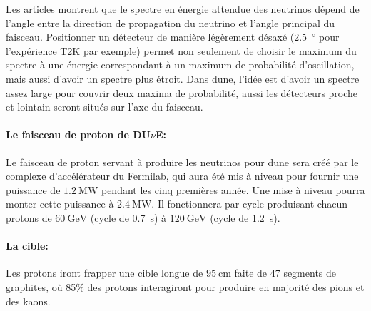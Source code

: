             Les articles \cite{Levy2010,McDonald2001,Itow2001} montrent que le spectre en énergie attendue des neutrinos dépend de l'angle entre la direction de propagation du neutrino et l'angle principal du faisceau. Positionner un détecteur de manière légèrement désaxé (\SI{2.5}{\degree} pour l'expérience T2K par exemple) permet non seulement de choisir le maximum du spectre à une énergie correspondant à un maximum de probabilité d'oscillation, mais aussi d'avoir un spectre plus étroit. Dans \gls{dune}, l'idée est d'avoir un spectre assez large pour couvrir deux maxima de probabilité, aussi les détecteurs proche et lointain seront situés sur l'axe du faisceau.
            
            \paragraph{Le faisceau de proton de DU$\nu$E:} Le faisceau de proton servant à produire les neutrinos pour \gls{dune} sera créé par le complexe d'accélérateur du Fermilab, qui aura été mis à niveau pour fournir une puissance de $\SI{1.2}{\mega\watt}$ pendant les cinq premières année. Une mise à niveau pourra monter cette puissance à $\SI{2.4}{\mega\watt}$. Il fonctionnera par cycle produisant chacun  protons de $\SI{60}{\giga\electronvolt}$ (cycle de \SI{0.7}{\second})  à $\SI{120}{\giga\electronvolt}$ (cycle de \SI{1.2}{\second}). 
            
            \paragraph{La cible:} Les protons iront frapper une cible longue de $\SI{95}{\centi\meter}$ faite de 47 segments de graphites, où 85\;\% des protons interagiront pour produire en majorité des pions et des kaons. 
            
